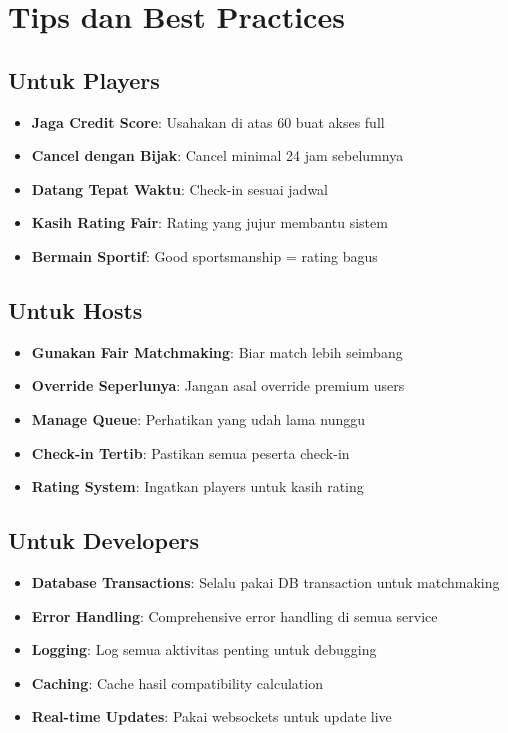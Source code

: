 \documentclass[12pt]{article}
\begin{document}
\section{Tips dan Best Practices}

\subsection{Untuk Players}

\begin{itemize}
    \item \textbf{Jaga Credit Score}: Usahakan di atas 60 buat akses full
    \item \textbf{Cancel dengan Bijak}: Cancel minimal 24 jam sebelumnya
    \item \textbf{Datang Tepat Waktu}: Check-in sesuai jadwal
    \item \textbf{Kasih Rating Fair}: Rating yang jujur membantu sistem
    \item \textbf{Bermain Sportif}: Good sportsmanship = rating bagus
\end{itemize}

\subsection{Untuk Hosts}

\begin{itemize}
    \item \textbf{Gunakan Fair Matchmaking}: Biar match lebih seimbang
    \item \textbf{Override Seperlunya}: Jangan asal override premium users
    \item \textbf{Manage Queue}: Perhatikan yang udah lama nunggu
    \item \textbf{Check-in Tertib}: Pastikan semua peserta check-in
    \item \textbf{Rating System}: Ingatkan players untuk kasih rating
\end{itemize}

\subsection{Untuk Developers}

\begin{itemize}
    \item \textbf{Database Transactions}: Selalu pakai DB transaction untuk matchmaking
    \item \textbf{Error Handling}: Comprehensive error handling di semua service
    \item \textbf{Logging}: Log semua aktivitas penting untuk debugging
    \item \textbf{Caching}: Cache hasil compatibility calculation
    \item \textbf{Real-time Updates}: Pakai websockets untuk update live
\end{itemize}
\end{document}
